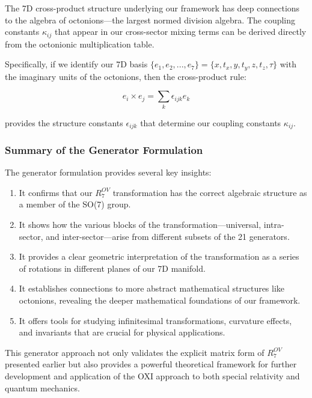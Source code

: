 \documentclass{article}
\begin{document}
The 7D cross-product structure underlying our framework has deep connections to the algebra of octonions—the largest normed division algebra. The coupling constants $\kappa_{ij}$ that appear in our cross-sector mixing terms can be derived directly from the octonionic multiplication table.

Specifically, if we identify our 7D basis $\{e_1, e_2, ..., e_7\} = \{x, t_x, y, t_y, z, t_z, \tau\}$ with the imaginary units of the octonions, then the cross-product rule:

\begin{equation}
e_i \times e_j = \sum_k \epsilon_{ijk} e_k
\end{equation}

provides the structure constants $\epsilon_{ijk}$ that determine our coupling constants $\kappa_{ij}$.

\subsubsection{Summary of the Generator Formulation}

The generator formulation provides several key insights:

\begin{enumerate}
\item It confirms that our $R^{OV}_7$ transformation has the correct algebraic structure as a member of the SO(7) group.
\item It shows how the various blocks of the transformation—universal, intra-sector, and inter-sector—arise from different subsets of the 21 generators.
\item It provides a clear geometric interpretation of the transformation as a series of rotations in different planes of our 7D manifold.
\item It establishes connections to more abstract mathematical structures like octonions, revealing the deeper mathematical foundations of our framework.
\item It offers tools for studying infinitesimal transformations, curvature effects, and invariants that are crucial for physical applications.
\end{enumerate}

This generator approach not only validates the explicit matrix form of $R^{OV}_7$ presented earlier but also provides a powerful theoretical framework for further development and application of the OXI approach to both special relativity and quantum mechanics.
\end{document}
